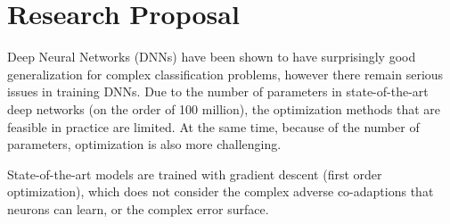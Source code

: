 \documentclass[]{article}
\begin{document}
\section{Research Proposal}
Deep Neural Networks (DNNs) have been shown to have surprisingly good generalization for complex classification problems, however there remain serious issues in training DNNs. Due to the number of parameters in state-of-the-art deep networks (on the order of 100 million), the optimization methods that are feasible in practice are limited. At the same time, because of the number of parameters, optimization is also more challenging. 

State-of-the-art models are trained with gradient descent (first order optimization), which does not consider the complex adverse co-adaptions that neurons can learn, or the complex error surface. 
\end{document}
